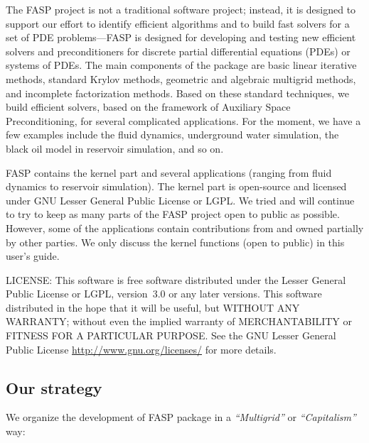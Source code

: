\documentclass[11pt]{memoir}
\begin{document}
The FASP project is not a traditional software project; instead, it is designed to support our effort to identify efficient algorithms and to build fast solvers for a set of PDE problems---FASP is designed for developing and testing new efficient solvers and preconditioners for discrete partial differential equations (PDEs) or systems of PDEs. The main components of the package are basic linear iterative methods, standard Krylov methods, geometric and algebraic multigrid methods, and incomplete factorization methods. Based on these standard techniques, we build efficient solvers, based on the framework of Auxiliary Space Preconditioning, for several complicated applications. For the moment, we have a few examples include the fluid dynamics, underground water simulation, the black oil model in reservoir simulation, and so on. 

FASP contains the kernel part and several applications (ranging from fluid dynamics to reservoir simulation). The kernel part is open-source and licensed under GNU Lesser General Public License or LGPL. We tried and will continue to try to keep as many parts of the FASP project open to public as possible. However, some of the applications contain contributions from and owned partially by other parties. We only discuss the kernel functions (open to public) in this user's guide.

\begin{snugshade}\noindent
LICENSE: This software is free software distributed under the Lesser General Public 
License or LGPL, version~3.0 or any later versions. This software distributed 
in the hope that it will be useful, but WITHOUT ANY WARRANTY; without even 
the implied warranty of MERCHANTABILITY or FITNESS FOR A PARTICULAR PURPOSE. See the GNU Lesser General Public License \url{http://www.gnu.org/licenses/} for more details.
\end{snugshade}

\subsection{Our strategy}

We organize the development of FASP package in a \emph{``Multigrid''} or \emph{``Capitalism''} way:
\end{document}
